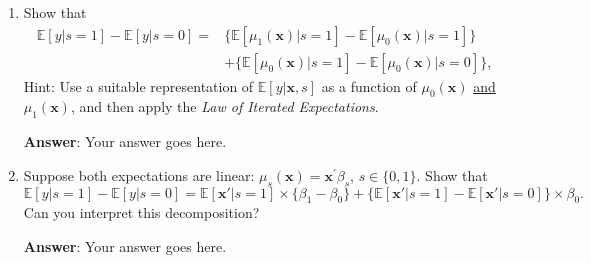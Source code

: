 \documentclass[12pt,letter]{article}%
\begin{document}
\begin{enumerate}
\begin{enumerate}
\item Show that
\begin{align*}
\mathbb{E}[y|s=1]-\mathbb{E}[y|s=0]=  &  \{\mathbb{E}[\mu_{1}(\mathbf{x}%
)|s=1]-\mathbb{E}[\mu_{0}(\mathbf{x})|s=1]\}\\
&  +\{\mathbb{E}[\mu_{0}(\mathbf{x})|s=1]-\mathbb{E}[\mu_{0}(\mathbf{x}%
)|s=0]\}\text{,}%
\end{align*}
Hint: Use a suitable representation of $\mathbb{E}[y|\mathbf{x},s]$ as a function of $\mu
_{0}(\mathbf{x})$ \underline{and} $\mu_{1}(\mathbf{x})$, and then apply the \emph{Law of Iterated Expectations}.

\noindent\textbf{Answer}: Your answer goes here.

\item Suppose both expectations are linear: $\mu_{s}(\mathbf{x})=\mathbf{x}%
^{\prime}{\beta}_{s}$, $s\in\{0,1\}$. Show that
\[
\mathbb{E}[y|s=1]-\mathbb{E}[y|s=0]=\mathbb{E}[\mathbf{x}'|s=1]\times\{{\beta
}_{1}-{\beta}_{0}\}+\{\mathbb{E}[\mathbf{x}'|s=1]-\mathbb{E}[\mathbf{x}'%
|s=0]\}\times{\beta}_{0}\text{.}%
\]
Can you interpret this decomposition?\medskip

\noindent\textbf{Answer}: Your answer goes here.

\end{enumerate}

\end{enumerate}
\end{document}
